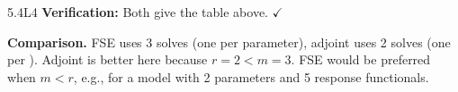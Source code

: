 \begin{solution}{5.4}{L4}
 \textbf{Verification:} Both give the table above. $\checkmark$

 \textbf{Comparison.}
FSE uses 3 solves (one per parameter), adjoint uses 2 solves (one per \QOI).
Adjoint is better here because $r = 2 < m = 3$.
FSE would be preferred when $m < r$, e.g., for a model with 2 parameters
and 5 response functionals.


\end{solution}

